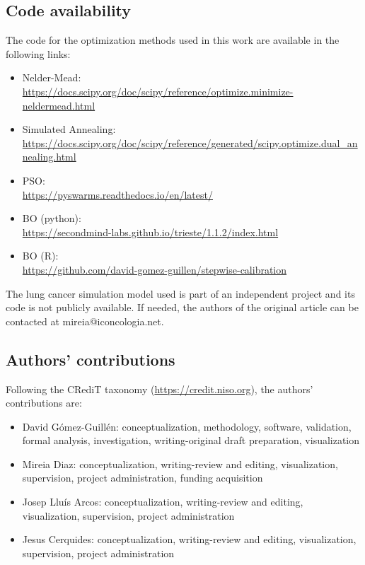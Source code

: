 \documentclass[sn-mathphys,Numbered]{sn-jnl}%
\begin{document}
\subsection*{Code availability}
The code for the optimization methods used in this work are available in the following links:
\begin{itemize}
	\item{Nelder-Mead: \\ \url{https://docs.scipy.org/doc/scipy/reference/optimize.minimize-neldermead.html}}
	\item{Simulated Annealing: \\ \url{https://docs.scipy.org/doc/scipy/reference/generated/scipy.optimize.dual_annealing.html}}
	\item{PSO: \\ \url{https://pyswarms.readthedocs.io/en/latest/}}
	\item{BO (python): \\ \url{https://secondmind-labs.github.io/trieste/1.1.2/index.html}}
	\item{BO (R): \\ \url{https://github.com/david-gomez-guillen/stepwise-calibration}}
\end{itemize}

The lung cancer simulation model used is part of an independent project and its code is not publicly available. If needed, the authors of the original article\cite{lung-model} can be contacted at mireia@iconcologia.net.

\subsection*{Authors' contributions}
Following the CRediT taxonomy (\url{https://credit.niso.org}), the authors' contributions are:
\begin{itemize}
	\item David Gómez-Guillén: conceptualization, methodology, software, validation, formal analysis, investigation, writing-original draft preparation, visualization
	\item Mireia Diaz: conceptualization, writing-review and editing, visualization, supervision, project administration, funding acquisition
	\item Josep Lluís Arcos: conceptualization, writing-review and editing, visualization, supervision, project administration
	\item Jesus Cerquides: conceptualization, writing-review and editing, visualization, supervision, project administration
\end{itemize}

\end{document}

